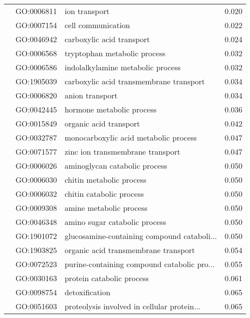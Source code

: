 \begin{longtable}{lllr}
   & GO:0006811 &                                ion transport &         0.020 \\
   & GO:0007154 &                           cell communication &         0.022 \\
   & GO:0046942 &                    carboxylic acid transport &         0.024 \\
   & GO:0006568 &                 tryptophan metabolic process &         0.032 \\
   & GO:0006586 &            indolalkylamine metabolic process &         0.032 \\
   & GO:1905039 &      carboxylic acid transmembrane transport &         0.034 \\
   & GO:0006820 &                              anion transport &         0.034 \\
   & GO:0042445 &                    hormone metabolic process &         0.036 \\
   & GO:0015849 &                       organic acid transport &         0.042 \\
   & GO:0032787 &        monocarboxylic acid metabolic process &         0.047 \\
   & GO:0071577 &             zinc ion transmembrane transport &         0.047 \\
   & GO:0006026 &                aminoglycan catabolic process &         0.050 \\
   & GO:0006030 &                     chitin metabolic process &         0.050 \\
   & GO:0006032 &                     chitin catabolic process &         0.050 \\
   & GO:0009308 &                      amine metabolic process &         0.050 \\
   & GO:0046348 &                amino sugar catabolic process &         0.050 \\
   & GO:1901072 &  glucosamine-containing compound cataboli... &         0.050 \\
   & GO:1903825 &         organic acid transmembrane transport &         0.054 \\
   & GO:0072523 &  purine-containing compound catabolic pro... &         0.055 \\
   & GO:0030163 &                    protein catabolic process &         0.061 \\
   & GO:0098754 &                               detoxification &         0.065 \\
   & GO:0051603 &  proteolysis involved in cellular protein... &         0.065 \\

\end{longtable}
